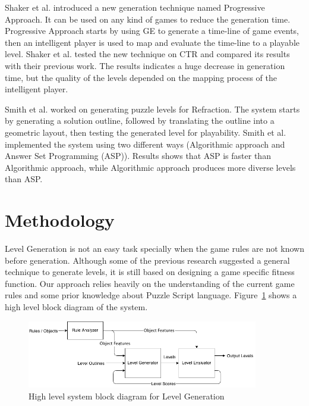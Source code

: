 \documentclass[letterpaper]{article}
\newcommand{\figref}[1]{Figure~\ref{Figure:#1}}
\begin{document}
Shaker et al.\cite{ctrProgressiveApproach} introduced a new generation technique named Progressive Approach. It can be used on any kind of games to reduce the generation time. Progressive Approach starts by using GE to generate a time-line of game events, then an intelligent player is used to map and evaluate the time-line to a playable level. Shaker et al. tested the new technique on CTR and compared its results with their previous work\cite{ctrSimulationApproach}. The results indicates a huge decrease in generation time, but the quality of the levels depended on the mapping process of the intelligent player.\\\par

Smith et al.\cite{refractionStudy} worked on generating puzzle levels for Refraction\cite{refraction}. The system starts by generating a solution outline, followed by translating the outline into a geometric layout, then testing the generated level for playability. Smith et al. implemented the system using two different ways (Algorithmic approach and Answer Set Programming (ASP)). Results shows that ASP is faster than Algorithmic approach, while Algorithmic approach produces more diverse levels than ASP.

\section{Methodology}
Level Generation is not an easy task specially when the game rules are not known before generation. Although some of the previous research suggested a general technique to generate levels, it is still based on designing a game specific fitness function. Our approach relies heavily on the understanding of the current game rules and some prior knowledge about Puzzle Script language. \figref{levelGenBlockDiagram} shows a high level block diagram of the system.\\\par

\begin{figure}[ht]
  	\centering
    \includegraphics[width=0.9\textwidth]{Images/levelGenBlockDiagram}
    \caption{High level system block diagram for Level Generation}
    \label{Figure:levelGenBlockDiagram}
\end{figure}
\end{document}

